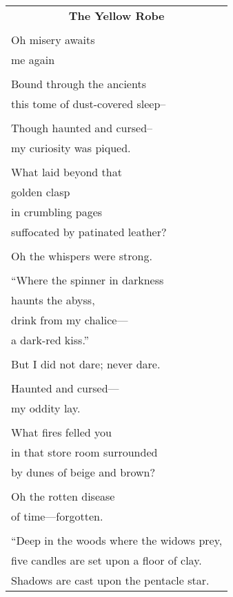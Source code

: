 \documentclass{article}
\begin{document}
\newcommand{\h}{\hspace*{4ex}}

\begin{center}
\begin{tabular}{l}
\multicolumn{1}{c}{\large\textbf{The Yellow Robe}} \\
\\
Oh misery awaits \\
       me again \\
\\
Bound through the ancients \\
   this tome of dust-covered sleep-- \\
\\
Though haunted and cursed-- \\
    my curiosity was piqued. \\
\\
What laid beyond that \\
    golden clasp \\
in crumbling pages \\
    suffocated by patinated leather? \\
\\
Oh the whispers were strong. \\
\\
``Where the spinner in darkness \\
haunts the abyss, \\
drink from my chalice--- \\
a dark-red kiss.'' \\
\\
But I did not dare; never dare. \\
\\
Haunted and cursed--- \\
   my oddity lay. \\
\\
What fires felled you \\
in that store room surrounded \\
by dunes of beige and brown? \\
\\
Oh the rotten disease \\
  of time---forgotten. \\
\\
``Deep in the woods where the widows prey, \\
five candles are set upon a floor of clay. \\
Shadows are cast upon the pentacle star. \\

\end{tabular}
\end{center}
\end{document}
